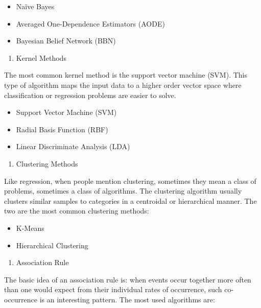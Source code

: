 \documentclass[
]{article}
\providecommand{\tightlist}{%
  \setlength{\itemsep}{0pt}\setlength{\parskip}{0pt}}
\begin{document}
\begin{itemize}
\tightlist
\item
  Naïve Bayes
\item
  Averaged One-Dependence Estimators (AODE)
\item
  Bayesian Belief Network (BBN)
\end{itemize}

\begin{enumerate}
\def\labelenumi{\arabic{enumi}.}
\setcounter{enumi}{6}
\tightlist
\item
  Kernel Methods
\end{enumerate}

The most common kernel method is the support vector machine (SVM). This
type of algorithm maps the input data to a higher order vector space
where classification or regression problems are easier to solve.

\begin{itemize}
\tightlist
\item
  Support Vector Machine (SVM)
\item
  Radial Basis Function (RBF)
\item
  Linear Discriminate Analysis (LDA)
\end{itemize}

\begin{enumerate}
\def\labelenumi{\arabic{enumi}.}
\setcounter{enumi}{7}
\tightlist
\item
  Clustering Methods
\end{enumerate}

Like regression, when people mention clustering, sometimes they mean a
class of problems, sometimes a class of algorithms. The clustering
algorithm usually clusters similar samples to categories in a centroidal
or hierarchical manner. The two are the most common clustering methods:

\begin{itemize}
\tightlist
\item
  K-Means
\item
  Hierarchical Clustering
\end{itemize}

\begin{enumerate}
\def\labelenumi{\arabic{enumi}.}
\setcounter{enumi}{8}
\tightlist
\item
  Association Rule
\end{enumerate}

The basic idea of an association rule is: when events occur together
more often than one would expect from their individual rates of
occurrence, such co- occurrence is an interesting pattern. The most used
algorithms are:
\end{document}
